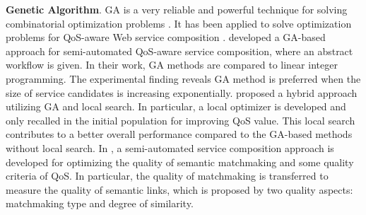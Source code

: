\textbf{Genetic Algorithm}. 
GA is a very reliable and powerful technique for solving combinatorial optimization problems \cite{srinivas1994genetic}. It has been applied to solve optimization problems for QoS-aware Web service composition \cite{wang2012survey}. \cite{canfora2005approach} developed a GA-based approach for semi-automated QoS-aware service composition, where an abstract workflow is given. In their work, GA methods are compared to linear integer programming. The experimental finding reveals GA method is preferred when the size of service candidates is increasing exponentially. \cite{tang2010hybrid} proposed a hybrid approach utilizing GA and local search. In particular, a local optimizer is developed and only recalled in the initial population for improving QoS value. This local search contributes to a better overall performance compared to the GA-based methods without local search. In \cite{lecue2009optimizing}, a semi-automated service composition approach is developed for optimizing the quality of semantic matchmaking and some quality criteria of QoS. In particular, the quality of matchmaking is transferred to measure the quality of semantic links, which is proposed by two quality aspects: matchmaking type and degree of similarity.

